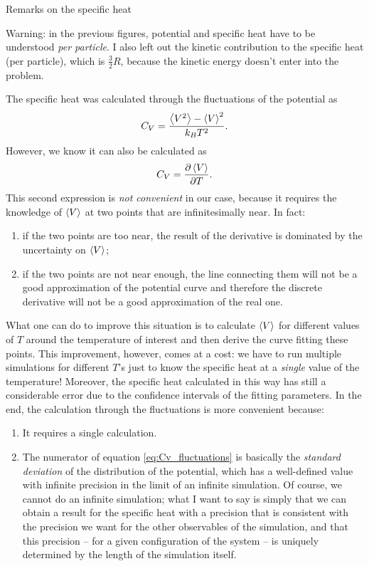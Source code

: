 \documentclass[10pt, compress, protectframetitle, handout]{beamer}
\begin{document}
\begin{frame}[allowframebreaks]{Remarks on the specific heat}

	Warning: in the previous figures, potential and specific heat have to be understood \emph{per particle}. I also left out the kinetic contribution to the specific heat (per particle), which is $\frac{3}{2}R$, because the kinetic energy doesn't enter into the problem.
	
	The specific heat was calculated through the fluctuations of the potential as
	\begin{equation}
		C_V = \frac{\Braket{V^2}-\Braket{V}^2}{k_BT^2}.
		\label{eq:Cv_fluctuations}
	\end{equation}
	However, we know it can also be calculated as
	\begin{equation}
		C_V = \frac{\partial \Braket{V}}{\partial T}.
	\end{equation}
	This second expression is \emph{not convenient} in our case, because it requires the knowledge of $\Braket{V}$ at two points that are infinitesimally near. In fact:
	\begin{enumerate}
		\item if the two points are too near, the result of the derivative is dominated by the uncertainty on $\Braket{V}$;
		\item if the two points are not near enough, the line connecting them will not be a good approximation of the potential curve and therefore the discrete derivative will not be a good approximation of the real one.
	\end{enumerate}
	
	What one can do to improve this situation is to calculate $\Braket{V}$ for different values of $T$ around the temperature of interest and then derive the curve \alert{fitting} these points. This improvement, however, comes at a cost: we have to run multiple simulations for different $T$'s just to know the specific heat at a \emph{single} value of the temperature! Moreover, the specific heat calculated in this way has still a considerable error due to the confidence intervals of the fitting parameters. In the end, the calculation through the fluctuations is more convenient because:
	\begin{enumerate}
		\item It requires a \alert{single calculation}.
		\item The numerator of equation \eqref{eq:Cv_fluctuations} is basically the \emph{standard deviation} of the distribution of the potential, which has a well-defined value with infinite precision in the limit of an infinite simulation. Of course, we cannot do an infinite simulation; what I want to say is simply that we can obtain a result for the specific heat with a precision that is consistent with the precision we want for the other observables of the simulation, and that this precision -- for a given configuration of the system -- is uniquely determined by the length of the simulation itself.
	\end{enumerate}
	

\end{frame}
\end{document}
